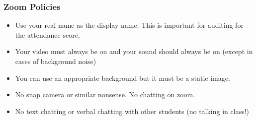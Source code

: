 \subsubsection*{Zoom Policies}

\begin{itemize}
\item Use your real name as the display name. This is important for auditing for the attendance score.
\item Your video must always be on and your sound should always be on (except in cases of background noise)
\item You can use an appropriate background but it must be a static image. 
\item No snap camera or similar nonsense. No chatting on zoom.
\item No text chatting or verbal chatting with other students (no talking in class!)
\end{itemize}